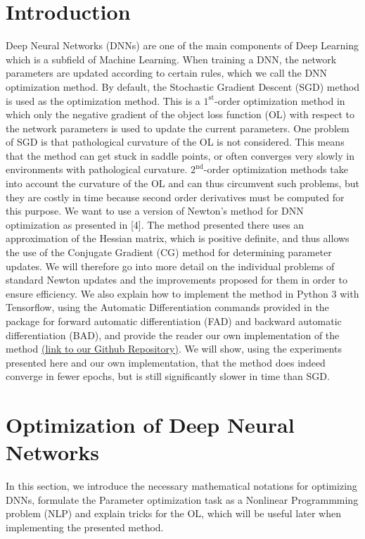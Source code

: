 \documentclass[conference]{IEEEtran}
\begin{document}
\section{Introduction} 
Deep Neural Networks (DNNs) are one of the main components of Deep Learning which is a subfield of Machine Learning. When training a DNN, the network parameters are updated according to certain rules, which we call the DNN optimization method. By default, the Stochastic Gradient Descent (SGD) method is used as the optimization method. This is a $1^{\text{st}}$-order optimization method in which only the negative gradient of the object loss function (OL) with respect to the network parameters is used to update the current parameters.
One problem of SGD is that pathological curvature of the OL is not considered. This means that the method can get stuck in saddle points, or often converges very slowly in environments with pathological curvature. 
$2^{\text{nd}}$-order optimization methods take into account the curvature of the OL and can thus circumvent such problems, but they are costly in time because second order derivatives must be computed for this purpose. 
We want to use a version of Newton's method for DNN optimization as presented in [4].
The method presented there uses an approximation of the Hessian matrix, which is positive definite, and thus allows the use of the Conjugate Gradient (CG) method for determining parameter updates. We will therefore go into more detail on the individual problems of standard Newton updates and the improvements proposed for them in order to ensure efficiency.
We also explain how to implement the method in Python 3 with Tensorflow, using the Automatic Differentiation commands provided in the package for forward automatic differentiation (FAD) and backward automatic differentiation (BAD), and provide the reader our own implementation of the method \href{https://github.com/NiklasBrunn/Hessian_Free_Optimization_of_Deep_Neural_Networks}{(link to our Github Repository)}. We will show, using the experiments presented here and our own implementation, that the method does indeed converge in fewer epochs, but is still significantly slower in time than SGD.


\section{Optimization of Deep Neural Networks}
In this section, we introduce the necessary mathematical notations for optimizing DNNs, formulate the Parameter optimization task as a Nonlinear Programmming problem (NLP) and explain tricks for the OL, which will be useful later when implementing the presented method.\\
\end{document}
